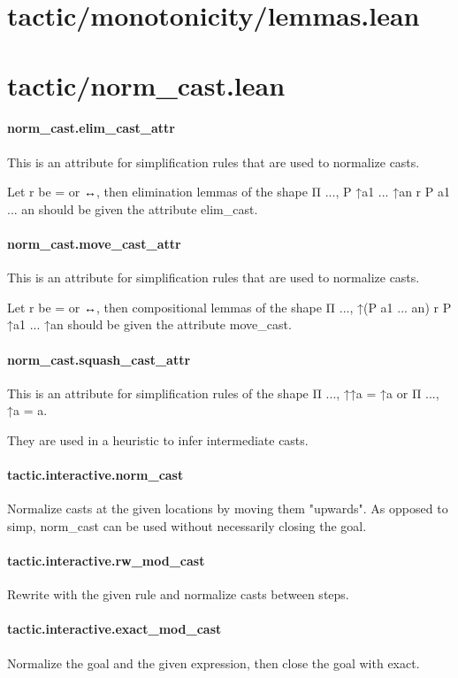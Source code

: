\documentclass{article}
\begin{document}
\section{tactic/monotonicity/lemmas.lean}\section{tactic/norm\_cast.lean}\paragraph{norm\_cast.elim\_cast\_attr}
\par
This is an attribute for simplification rules that are
used to normalize casts.
\par
Let r be = or ↔, then elimination lemmas of the shape
Π ..., P ↑a1 ... ↑an r P a1 ... an should be given the
attribute elim\_cast.
\paragraph{norm\_cast.move\_cast\_attr}
\par
This is an attribute for simplification rules that are
used to normalize casts.
\par
Let r be = or ↔, then compositional lemmas of the shape
Π ..., ↑(P a1 ... an) r P ↑a1 ... ↑an should be given the
attribute move\_cast.
\paragraph{norm\_cast.squash\_cast\_attr}
\par
This is an attribute for simplification rules of the shape
Π ..., ↑↑a = ↑a or  Π ..., ↑a = a.
\par
They are used in a heuristic to infer intermediate casts.
\paragraph{tactic.interactive.norm\_cast}
\par
Normalize casts at the given locations by moving them "upwards".
As opposed to simp, norm\_cast can be used without necessarily
closing the goal.
\paragraph{tactic.interactive.rw\_mod\_cast}
\par
Rewrite with the given rule and normalize casts between steps.
\paragraph{tactic.interactive.exact\_mod\_cast}
\par
Normalize the goal and the given expression,
then close the goal with exact.
\end{document}
